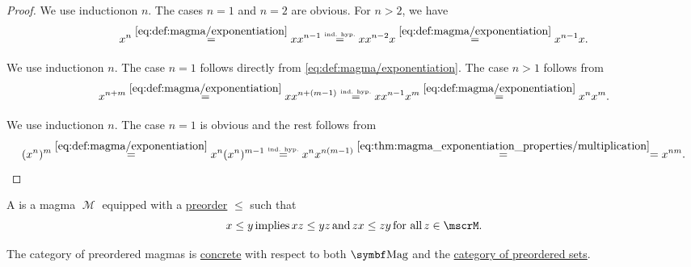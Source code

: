 \begin{proof}
   We use induction\IND on \( n \). The cases \( n = 1 \) and \( n = 2 \) are obvious. For \( n > 2 \), we have
  \begin{equation*}
    x^n
    \overset {\eqref{eq:def:magma/exponentiation}} =
    x x^{n-1}
    \overset {\scriptscriptstyle{\text{ind. hyp.}}} =
    x x^{n-2} x
    \overset {\eqref{eq:def:magma/exponentiation}} =
    x^{n-1} x.
  \end{equation*}

   We use induction\LEM on \( n \). The case \( n = 1 \) follows directly from \eqref{eq:def:magma/exponentiation}. The case \( n > 1 \) follows from
  \begin{equation*}
    x^{n + m}
    \overset {\eqref{eq:def:magma/exponentiation}} =
    x x^{n + (m - 1)}
    \overset {\scriptscriptstyle{\text{ind. hyp.}}} =
    x x^{n-1} x^m
    \overset {\eqref{eq:def:magma/exponentiation}} =
    x^n x^m.
  \end{equation*}

   We use induction\LEM on \( n \). The case \( n = 1 \) is obvious and the rest follows from
  \begin{equation*}
    (x^n)^m
    \overset {\eqref{eq:def:magma/exponentiation}} =
    x^n (x^n)^{m-1}
    \overset {\scriptscriptstyle{\text{ind. hyp.}}} =
    x^n x^{n (m - 1)}
    \overset {\eqref{eq:thm:magma_exponentiation_properties/multiplication}} =
    =
    x^{nm}.
  \end{equation*}
\end{proof}

\begin{definition}\label{def:preordered_magma}
  A  is a magma \( \mscrM \) equipped with a \hyperref[def:preordered_set]{preorder} \( \leq \) such that
  \begin{equation}\label{eq:def:preordered_magma/compatibility}
    x \leq y \T{implies} xz \leq yz \T{and} zx \leq zy \T{for all} z \in \mscrM.
  \end{equation}

  The category of preordered magmas is \hyperref[def:concrete_category]{concrete} with respect to both \( \Cat{Mag} \) and the \hyperref[def:preordered_magma]{category of preordered sets}.
\end{definition}

